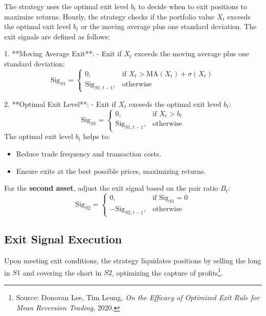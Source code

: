 \documentclass{article}
\begin{document}
The strategy uses the optimal exit level \( b_t \) to decide when to exit positions to maximize returns. Hourly, the strategy checks if the portfolio value \( X_t \) exceeds the optimal exit level \( b_t \) or the moving average plus one standard deviation. The exit signals are defined as follows:



1. **Moving Average Exit**:
    - Exit if \( X_t \) exceeds the moving average plus one standard deviation:
    \[
    \text{Sig}_{S1} = 
    \begin{cases} 
    0, & \text{if } X_t > \text{MA}(X_t) + \sigma(X_t) \\
    \text{Sig}_{S1, t-1}, & \text{otherwise}
    \end{cases}
    \]

2. **Optimal Exit Level**:
    - Exit if \( X_t \) exceeds the optimal exit level \( b_t \):
    \[
    \text{Sig}_{S1} = 
    \begin{cases} 
    0, & \text{if } X_t > b_t \\
    \text{Sig}_{S1, t-1}, & \text{otherwise}
    \end{cases}
    \]
The optimal exit level \( b_t \) helps to:
\begin{itemize}

    \item Reduce trade frequency and transaction costs.
    \item Ensure exits at the best possible prices, maximizing returns.
\end{itemize}\vspace{1em}

For the \textbf{second asset}, adjust the exit signal based on the pair ratio \( B_t \):
\[
\text{Sig}_{S2} = 
\begin{cases} 
0, & \text{if } \text{Sig}_{S1} = 0 \\
-\text{Sig}_{S2, t-1}, & \text{otherwise}
\end{cases}
\]


\subsection*{Exit Signal Execution}

Upon meeting exit conditions, the strategy liquidates positions by selling the long in \( S1 \) and covering the short in \( S2 \), optimizing the capture of profits\footnote{Source: Donovan Lee, Tim Leung, \textit{On the Efficacy of Optimized Exit Rule for Mean Reversion Trading}, 2020.}.\\
\end{document}
